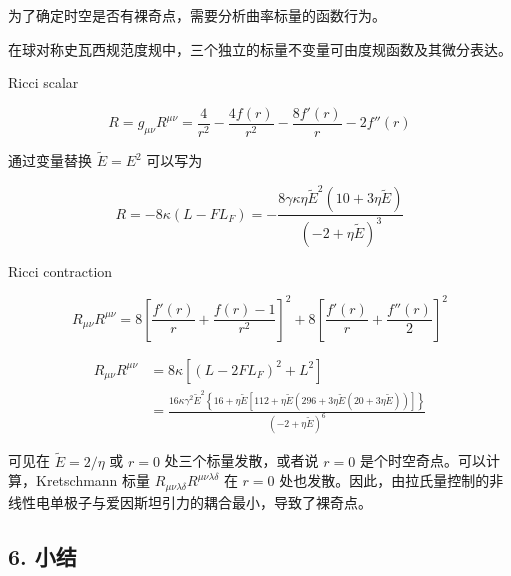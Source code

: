 \documentclass[aps,prl,preprint,groupedaddress]{revtex4-2}
\begin{document}
为了确定时空是否有裸奇点，需要分析曲率标量的函数行为。

在球对称史瓦西规范度规中，三个独立的标量不变量可由度规函数及其微分表达。

Ricci  scalar

$$
R
=g_{\mu\nu} R^{\mu\nu}
=\frac{4 }{r^2 } - \frac{4f(r) }{r^2 } - \frac{8f'(r) }{r } - 2f''(r) 
$$

通过变量替换 $\tilde{E}=E^2$ 可以写为

$$
R
=-8\kappa \left(L-FL_F \right)
=-\frac{8\gamma\kappa \eta\tilde{E}^2\left(10+3\eta\tilde{E} \right) }{\left(-2+\eta\tilde{E} \right)^3 }
$$

Ricci contraction

$$
R_{\mu\nu} R^{\mu\nu}
=8\left[\frac{f'(r) }{r } + \frac{f(r)-1 }{r^2 }  \right]^2 + 8 \left[\frac{f'(r) }{r } + \frac{f''(r) }{2 }  \right]^2
$$

$$
\begin{aligned}
    R_{\mu\nu} R^{\mu\nu}
    &=8\kappa\left[\left(L - 2FL_F \right)^2 + L^2 \right] \\
    &=\frac{16\kappa \gamma^2 \tilde{E}^2 \left\{16+\eta \tilde{E}\left[112+\eta\tilde{E}\left(296+3\eta \tilde{E}\left(20+3\eta\tilde{E} \right) \right) \right] \right\} }{\left(-2+\eta\tilde{E} \right)^6 }
\end{aligned}
$$

可见在 $\tilde{E}=2/\eta $ 或 $r=0$ 处三个标量发散，或者说 $r=0$ 是个时空奇点。可以计算，Kretschmann 标量 $R_{\mu\nu\lambda\delta}R^{\mu\nu\lambda\delta}  $ 在 $r=0$ 处也发散。因此，由拉氏量控制的非线性电单极子与爱因斯坦引力的耦合最小，导致了裸奇点。

\subsection{6. 小结}
\end{document}
